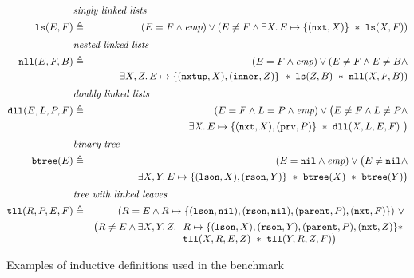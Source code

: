 \documentclass[twoside,11pt]{article}
\newcommand{\sep}{.\,}
\newcommand{\posep}{*}
\newcommand{\points}{\mapsto}
\newcommand{\nil}{\mathtt{nil}}
\newcommand{\ls}{\mathtt{ls}}
\newcommand{\dll}{\mathtt{dll}}
\newcommand{\nll}{\mathtt{nll}}
\begin{document}
\begin{table}
\begin{eqnarray}
%
\lefteqn{\textit{singly linked lists}} \nonumber \\
\ls(E,F) & \triangleq & (E=F\land\mathit{emp}) \lor (E\neq F \land 
\exists X\sep E\points\{(\texttt{nxt},X)\}\ \posep\ \ls(X,F)) 
\\[1mm]
%  
\lefteqn{\textit{nested linked lists}} \nonumber \\ 
\nll(E,F,B) & \triangleq & (E=F\land\mathit{emp}) \lor (E\neq F \land E\neq B \land \\
&& \exists X,Z\sep E\points\{(\texttt{nxtup},X),(\texttt{inner},Z)\}\ \posep\ \ls(Z,B)\ \posep\ \nll(X,F,B)) \nonumber
\\[1mm]
%  
\lefteqn{\textit{doubly linked lists}} \nonumber \\ 
\dll(E, L, P, F) & \triangleq & (E=F\land L=P\land \mathit{emp}) \lor \big( E\neq F \land L\neq P \land \\
&& \exists X\sep E\points \{(\texttt{nxt},X),(\texttt{prv},P)\}\ \posep\ \dll(X,L,E,F)\ \big)\nonumber
\\[1mm]
%  
\lefteqn{\textit{binary tree}} \nonumber \\ 
\mathtt{btree}(E) & \triangleq & (E=\nil\land \mathit{emp}) \lor \big( E\neq \nil \land 
\\
&& \exists X,Y\sep E\points \{(\texttt{lson},X),(\texttt{rson},Y)\}\ \posep\ \mathtt{btree}(X)\ \posep\ \mathtt{btree}(Y)\big)
\nonumber 
\\[1mm]
%  
\lefteqn{\textit{tree with linked leaves}} \nonumber \\ 
\mathtt{tll}(R,P,E,F) & \triangleq & (R=E \land R\points \{(\texttt{lson},\nil),(\texttt{rson},\nil),(\texttt{parent},P),(\texttt{nxt},F)\}) ~\lor~ \\
&&\big( R\neq E \land \exists X,Y,Z\sep 
\begin{array}[t]{l}
R\points \{(\texttt{lson},X),(\texttt{rson},Y),(\texttt{parent},P),(\texttt{nxt},Z)\} \posep \\
\mathtt{tll}(X,R,E,Z)\ \posep\ \mathtt{tll}(Y,R,Z,F)\big)
\end{array} \nonumber  
\end{eqnarray}
\caption{Examples of inductive definitions used in the benchmark}
\label{tab:RD}
\vspace{-3eX}
\end{table}
\end{document}
